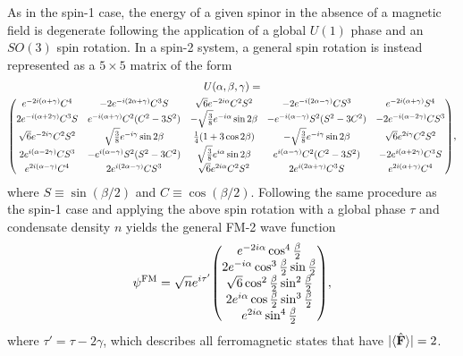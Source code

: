 As in the spin-1 case, the energy of a given spinor in the absence of a magnetic
field is degenerate following the application of a global \(U(1)\) phase and an
\(SO(3)\) spin rotation.
In a spin-2 system, a general spin rotation is instead represented as a
\(5\times 5\) matrix of the form~\cite{Kawaguchi2012}
\begin{multline}\label{eq: spin-2-rotation-matrix}
    U(\alpha, \beta, \gamma) = \\
    \scalemath{0.90}{\mqty(
    e^{-2i(\alpha + \gamma)}C^4 & -2e^{-i(2\alpha+\gamma)}C^3S
    & \sqrt{6}e^{-2i\alpha}C^2S^2 & -2e^{-i(2\alpha-\gamma)}CS^3
    & e^{-2i(\alpha + \gamma)}S^4
    \\
    2e^{-i(\alpha+2\gamma)}C^3S & e^{-i(\alpha+\gamma)}C^2(C^2-3S^2)
    & -\sqrt{\frac{3}{8}}e^{-i\alpha}\sin 2\beta
    & -e^{-i(\alpha-\gamma)}S^2(S^2-3C^2) & -2e^{-i(\alpha-2\gamma)}CS^3
    \\
    \sqrt{6}e^{-2i\gamma}C^2S^2 & \sqrt{\frac{3}{8}}e^{-i\gamma}\sin 2\beta
    & \frac{1}{4}(1+3\cos 2\beta)
    & -\sqrt{\frac{3}{8}}e^{-i\gamma}\sin 2\beta
    & \sqrt{6}e^{2i\gamma}C^2S^2
    \\
    2e^{i(\alpha-2\gamma)}CS^3 & -e^{i(\alpha-\gamma)}S^2(S^2-3C^2)
    & \sqrt{\frac{3}{8}}e^{i\alpha}\sin 2\beta
    & e^{i(\alpha-\gamma)}C^2(C^2-3S^2) & -2e^{i(\alpha+2\gamma)}C^3S
    \\
    e^{2i(\alpha - \gamma)}C^4 & 2e^{i(2\alpha-\gamma)}CS^3
    & \sqrt{6}e^{2i\alpha}C^2S^2 & 2e^{i(2\alpha+\gamma)}C^3S
    & e^{2i(\alpha + \gamma)}C^4
    )},
\end{multline}
where \(S \equiv \sin(\beta/2)\) and \(C \equiv \cos(\beta/2)\).
Following the same procedure as the spin-1 case and applying the above spin
rotation with a global phase \(\tau \) and condensate density \(n\) yields the
general FM-2 wave function
\begin{equation}\label{eq: FM-2-representative-spinor}
    \psi^\mathrm{FM} = \sqrt{n}e^{i\tau'}\mqty(
    e^{-2i\alpha} \cos^4\frac{\beta}{2} \\
    2e^{-i\alpha}\cos^3\frac{\beta}{2}\sin \frac{\beta}{2} \\
    \sqrt{6} \cos^2\frac{\beta}{2} \sin^2\frac{\beta}{2} \\
    2e^{i\alpha}\cos\frac{\beta}{2} \sin^3\frac{\beta}{2} \\
    e^{2i\alpha} \sin^4\frac{\beta}{2}
    ),
\end{equation}
where \(\tau'=\tau-2\gamma \), which describes all ferromagnetic states that
have \(|\langle \hat{\vb{F}} \rangle |=2\).

